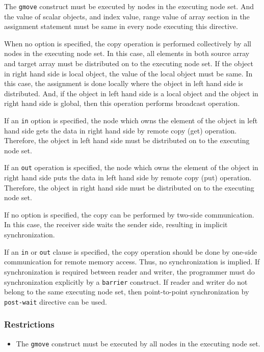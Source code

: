 The {\tt gmove} construct must be executed by nodes in the executing
node set. And the value of scalar objects, and index value, range
value of array section in the assignment statement must be same in
every node executing this directive.

When no option is specified, the copy operation is performed
collectively by all nodes in the executing node set. In this case, all
elements in both source array and target array must be distributed on
to the executing node set. If the object in right hand side is local
object, the value of the local object must be same. In this case, the
assignment is done locally where the object in left hand side is 
distributed. And, if the object in left hand side is a local object
and the object in right hand side is global, then this operation
performs broadcast operation.

If an {\tt in} option is specified, the node which owns the element of
the object in left hand side gets the data in right hand side by
remote copy (get) operation. Therefore, the object in left hand side
must be distributed on to the executing node set. 

If an {\tt out} operation is specified, the node which owns the element
of the object in right hand side puts the data in left hand side by
remote copy (put) operation. Therefore, the object in right hand side
must be distributed on to the executing node set.

If no option is specified, the copy can be performed by two-side
communication. In this case, the receiver side waits the sender side,
resulting in implicit synchronization. 

If an {\tt in} or {\tt out} clause is specified, the
copy operation should be done by one-side communication for remote
memory access. Thus, no synchronization is implied. If
synchronization is required between reader and writer, the programmer
must do synchronization explicitly by a {\tt barrier} construct. If reader
and writer do not belong to the same executing node set, then
point-to-point synchronization by {\tt post-wait} directive can be
used.

\subsubsection*{Restrictions}

\begin{itemize}
\item The {\tt gmove} construct must be executed by all nodes in the
  executing node set.
\end{itemize}

